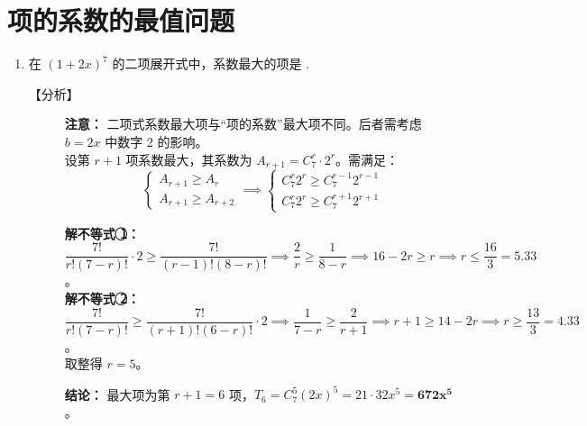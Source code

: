 \documentclass[11pt,a4paper]{article}
\begin{document}
\vspace{2em}

\section{项的系数的最值问题}

\begin{enumerate}[label=\arabic*., start=12, leftmargin=1.5em]

    \item 在 $(1+2x)^7$ 的二项展开式中，系数最大的项是 \underline{\hspace{2cm}}.
    
    \begin{description}
        \item[【分析】] 
        \textbf{注意：} 二项式系数最大项与“项的系数”最大项不同。后者需考虑 $b=2x$ 中数字 2 的影响。\\
        设第 $r+1$ 项系数最大，其系数为 $A_{r+1} = C_7^r \cdot 2^r$。需满足：
        \[ \begin{cases} A_{r+1} \geq A_r \\ A_{r+1} \geq A_{r+2} \end{cases} \implies \begin{cases} C_7^r 2^r \geq C_7^{r-1} 2^{r-1} \\ C_7^r 2^r \geq C_7^{r+1} 2^{r+1} \end{cases} \]
        
        \textbf{解不等式 \textcircled{1}：} $\dfrac{7!}{r!(7-r)!} \cdot 2 \geq \dfrac{7!}{(r-1)!(8-r)!} \implies \dfrac{2}{r} \geq \dfrac{1}{8-r} \implies 16-2r \geq r \implies r \leq \dfrac{16}{3} = 5.33$。\\
        \textbf{解不等式 \textcircled{2}：} $\dfrac{7!}{r!(7-r)!} \geq \dfrac{7!}{(r+1)!(6-r)!} \cdot 2 \implies \dfrac{1}{7-r} \geq \dfrac{2}{r+1} \implies r+1 \geq 14-2r \implies r \geq \dfrac{13}{3} = 4.33$。\\
        取整得 $r=5$。
        
        \textbf{结论：} 最大项为第 $r+1=6$ 项，$T_6 = C_7^5 (2x)^5 = 21 \cdot 32x^5 = \mathbf{672x^5}$。
    \end{description}

\end{enumerate}

\newpage
\end{document}
